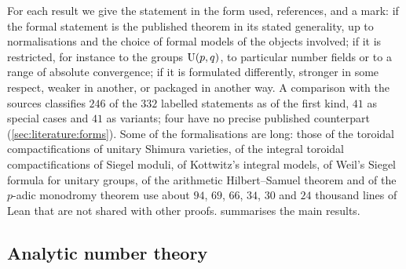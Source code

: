 For each result we give the statement in the form used, references, and a mark:
 if the formal statement is the published theorem in its stated generality,
up to normalisations and the choice of formal models of the objects involved;
 if it is restricted, for instance to the groups $\operatorname{U}(p,q)$, to
particular number fields or to a range of absolute convergence;  if it is
formulated differently, stronger in some respect, weaker in another, or packaged in another way.
A comparison with the sources classifies $246$ of the $332$ labelled statements as of the first
kind, $41$ as special cases and $41$ as variants; four have no precise published counterpart
(\cref{sec:literature:forms}).  Some of the
formalisations are long: those of the toroidal compactifications of unitary Shimura varieties, of
the integral toroidal compactifications of Siegel moduli, of Kottwitz's integral models, of Weil's
Siegel formula for unitary groups, of the arithmetic Hilbert--Samuel theorem and of the $p$-adic
monodromy theorem use about $94$, $69$, $66$, $34$, $30$ and $24$ thousand lines of Lean that are
not shared with other proofs.   summarises the main results.

\subsection{Analytic number theory}\label{sec:literature:ant}


